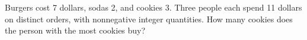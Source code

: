 Burgers cost 7 dollars, sodas 2, and cookies 3. Three people each spend 11 dollars on distinct orders, with nonnegative integer quantities. How many cookies does the person with the most cookies buy?
